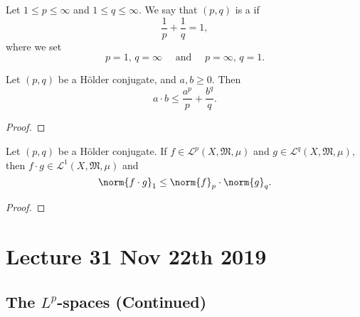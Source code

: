 \documentclass[notoc,notitlepage]{tufte-book}
\begin{document}
\begin{defn}\label{defn:holder_conjugates}
  Let $1 \leq p \leq \infty$ and $1 \leq q \leq \infty$.
  We say that $(p, q)$ is a  if
  \begin{equation*}
    \frac{1}{p} + \frac{1}{q} = 1,
  \end{equation*}
  where we set
  \begin{equation*}
    p = 1,\, q = \infty \quad\text{ and }\quad
    p = \infty,\, q = 1.
  \end{equation*}
\end{defn}

\begin{lemma}\label{lemma:young_s_inequality}
  Let $(p, q)$ be a Hölder conjugate, and $a, b \geq 0$.
  Then
  \begin{equation*}
    a \cdot b \leq \frac{a^p}{p} + \frac{b^q}{q}.
  \end{equation*}
\end{lemma}

\begin{proof}
\end{proof}

\begin{thm}\label{thm:holder_s_inequality}
  Let $(p, q)$ be a Hölder conjugate.
  If $f \in \mathcal{L}^p(X, \mathfrak{M}, \mu)$
  and $g \in \mathcal{L}^q(X, \mathfrak{M}, \mu)$, then
  $f \cdot g \in \mathcal{L}^1(X, \mathfrak{M}, \mu)$ and
  \begin{equation*}
    \norm{f \cdot g}_1 \leq \norm{f}_p \cdot \norm{g}_q.
  \end{equation*}
\end{thm}

\begin{proof}
\end{proof}



\chapter{Lecture 31 Nov 22th 2019}%
\label{chp:lecture_31_nov_22th_2019}

\section{The \texorpdfstring{$L^p$}{Lp}-spaces (Continued)}%
\label{sec:the_l_p_spaces_continued}
\end{document}
